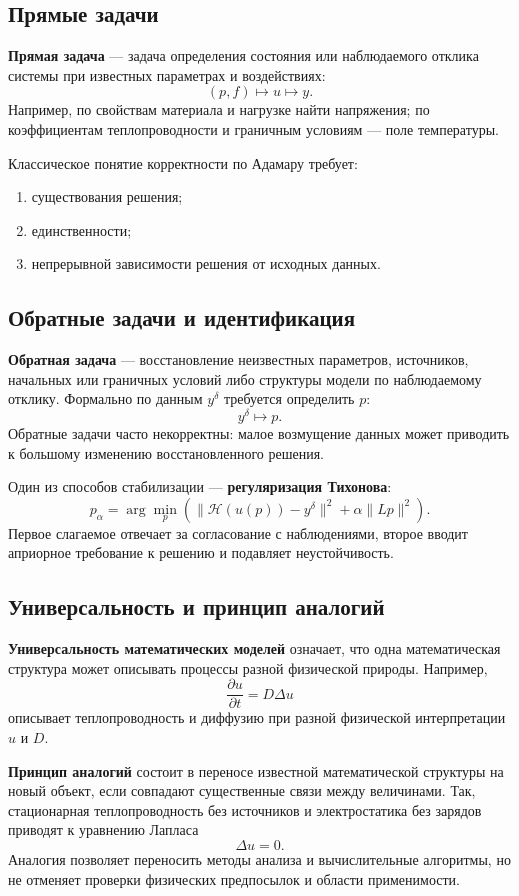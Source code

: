 \subsection{Прямые задачи}

\textbf{Прямая задача} --- задача определения состояния или наблюдаемого отклика системы при известных параметрах и воздействиях:
\[
(p,f)\longmapsto u\longmapsto y.
\]
Например, по свойствам материала и нагрузке найти напряжения; по коэффициентам теплопроводности и граничным условиям --- поле температуры.

Классическое понятие корректности по Адамару требует:
\begin{enumerate}
\item существования решения;
\item единственности;
\item непрерывной зависимости решения от исходных данных.
\end{enumerate}

\subsection{Обратные задачи и идентификация}

\textbf{Обратная задача} --- восстановление неизвестных параметров, источников, начальных или граничных условий либо структуры модели по наблюдаемому отклику. Формально по данным $y^\delta$ требуется определить $p$:
\[
y^\delta\longmapsto p.
\]
Обратные задачи часто некорректны: малое возмущение данных может приводить к большому изменению восстановленного решения.

Один из способов стабилизации --- \textbf{регуляризация Тихонова}:
\[
p_\alpha=\arg\min_p
\left(
\|\mathcal H(u(p))-y^\delta\|^2
+\alpha\|Lp\|^2
\right).
\]
Первое слагаемое отвечает за согласование с наблюдениями, второе вводит априорное требование к решению и подавляет неустойчивость.

\subsection{Универсальность и принцип аналогий}

\textbf{Универсальность математических моделей} означает, что одна математическая структура может описывать процессы разной физической природы. Например,
\[
\frac{\partial u}{\partial t}=D\Delta u
\]
описывает теплопроводность и диффузию при разной физической интерпретации $u$ и $D$.

\textbf{Принцип аналогий} состоит в переносе известной математической структуры на новый объект, если совпадают существенные связи между величинами. Так, стационарная теплопроводность без источников и электростатика без зарядов приводят к уравнению Лапласа
\[
\Delta u=0.
\]
Аналогия позволяет переносить методы анализа и вычислительные алгоритмы, но не отменяет проверки физических предпосылок и области применимости.

